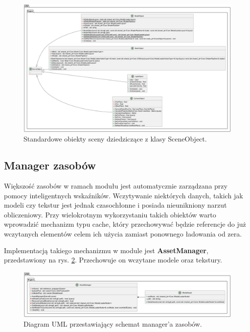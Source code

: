 	\begin{figure}[h!]
		\centering
		\includegraphics[width=\textwidth]{images/UML/sceneobjects.png}
		\caption{Standardowe obiekty sceny dziedziczące z klasy SceneObject.}
		\label{UML_SceneObjects}
	\end{figure}
	
	\vfill
	\clearpage
	
\subsection{Manager zasobów}
	Większość zasobów w ramach modułu jest automatycznie zarządzana przy pomocy inteligentnych wskaźników. Wczytywanie niektórych danych, takich jak modeli czy tekstur jest jednak czasochłonne i posiada nieunikniony narzut obliczeniowy. Przy wielokrotnym wykorzystaniu takich obiektów warto wprowadzić mechanizm typu cache, który przechowywać będzie referencje do już wczytanych elementów celem ich użycia zamiast ponownego ładowania od zera.
	
	Implementacją takiego mechanizmu w module jest \textbf{AssetManager}, przedstawiony na rys. \ref{UML_AssetManager}. Przechowuje on wczytane modele oraz tekstury.
	
	\begin{figure}[h!]
		\centering
		\includegraphics[width=\textwidth]{images/UML/assets.png}
		\caption{Diagram UML przestawiający schemat manager'a zasobów.}
		\label{UML_AssetManager}
	\end{figure}